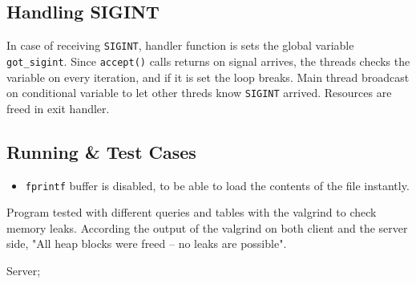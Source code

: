 \documentclass[a4paper]{article}
\begin{document}
\subsection*{Handling SIGINT}
\label{sec:org1660c0c}
In case of receiving \texttt{SIGINT}, handler function is sets the global variable \texttt{got\_sigint}. Since \texttt{accept()} calls returns on signal arrives, the threads checks the  variable on every iteration, and if it is set the loop breaks.  Main thread broadcast on conditional variable to let other threds know \texttt{SIGINT} arrived. Resources are freed in exit handler.

\subsection*{Running \& Test Cases}
\label{sec:org4c014ef}
\begin{itemize}
\item \texttt{fprintf} buffer is disabled, to be able to load the contents of the file instantly.
\end{itemize}

Program tested with different queries and tables with the valgrind to check memory leaks. According the output of the valgrind on both client and the server side, "All heap blocks were freed -- no leaks are possible".

Server;
\end{document}

